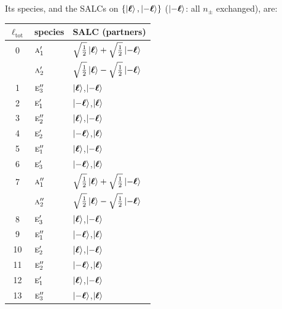 \documentclass[11pt]{article}
\newcommand{\irr}[1]{\text{\normalfont\scshape #1}}
\begin{document}
Its species, and the SALCs on $\{\ket{\boldsymbol\ell},\ket{-\boldsymbol\ell}\}$ ($\ket{-\boldsymbol\ell}$: all $n_\pm$ exchanged), are:

\begin{longtable}{c l l}\hline $\ell_{\mathrm{tot}}$ & species & SALC (partners)\\ \hline\endhead

0 & $\irr{a}_{1}'$ & $\sqrt{\tfrac{1}{2}}\ket{\boldsymbol\ell}+\sqrt{\tfrac{1}{2}}\ket{-\boldsymbol\ell}$\\

 & $\irr{a}_{2}'$ & $\sqrt{\tfrac{1}{2}}\ket{\boldsymbol\ell}-\sqrt{\tfrac{1}{2}}\ket{-\boldsymbol\ell}$\\

1 & $\irr{e}_{3}''$ & $\ket{\boldsymbol\ell}$,\quad $\ket{-\boldsymbol\ell}$\\

2 & $\irr{e}_{1}'$ & $\ket{-\boldsymbol\ell}$,\quad $\ket{\boldsymbol\ell}$\\

3 & $\irr{e}_{2}''$ & $\ket{\boldsymbol\ell}$,\quad $\ket{-\boldsymbol\ell}$\\

4 & $\irr{e}_{2}'$ & $\ket{-\boldsymbol\ell}$,\quad $\ket{\boldsymbol\ell}$\\

5 & $\irr{e}_{1}''$ & $\ket{\boldsymbol\ell}$,\quad $\ket{-\boldsymbol\ell}$\\

6 & $\irr{e}_{3}'$ & $\ket{-\boldsymbol\ell}$,\quad $\ket{\boldsymbol\ell}$\\

7 & $\irr{a}_{1}''$ & $\sqrt{\tfrac{1}{2}}\ket{\boldsymbol\ell}+\sqrt{\tfrac{1}{2}}\ket{-\boldsymbol\ell}$\\

 & $\irr{a}_{2}''$ & $\sqrt{\tfrac{1}{2}}\ket{\boldsymbol\ell}-\sqrt{\tfrac{1}{2}}\ket{-\boldsymbol\ell}$\\

8 & $\irr{e}_{3}'$ & $\ket{\boldsymbol\ell}$,\quad $\ket{-\boldsymbol\ell}$\\

9 & $\irr{e}_{1}''$ & $\ket{-\boldsymbol\ell}$,\quad $\ket{\boldsymbol\ell}$\\

10 & $\irr{e}_{2}'$ & $\ket{\boldsymbol\ell}$,\quad $\ket{-\boldsymbol\ell}$\\

11 & $\irr{e}_{2}''$ & $\ket{-\boldsymbol\ell}$,\quad $\ket{\boldsymbol\ell}$\\

12 & $\irr{e}_{1}'$ & $\ket{\boldsymbol\ell}$,\quad $\ket{-\boldsymbol\ell}$\\

13 & $\irr{e}_{3}''$ & $\ket{-\boldsymbol\ell}$,\quad $\ket{\boldsymbol\ell}$\\

\hline\end{longtable}
\end{document}
